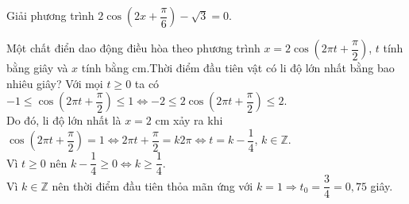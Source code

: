 
\TL

\begin{ex}%
	Giải phương trình $2 \cos \left(2 x+\dfrac{\pi}{6}\right)-\sqrt{3}=0$.
\end{ex}

\begin{ex}%
	Một chất điển dao động điều hòa theo phương trình $x= 2 \cos \left( 2\pi t + \dfrac{\pi}{2} \right)$, $t$ tính bằng giây và $x$ tính bằng cm.Thời điểm đầu tiên vật có li độ lớn nhất bằng bao nhiêu giây?
	\loigiai
	{
		Với mọi $t \ge 0$ ta có $-1 \le \cos \left( 2\pi t + \dfrac{\pi}{2} \right) \le 1 \Leftrightarrow -2 \le 2 \cos \left( 2\pi t + \dfrac{\pi}{2} \right) \le 2$.\\
		Do đó, li độ lớn nhất là $x=2$ cm xảy ra khi \\
		$ \cos \left( 2\pi t + \dfrac{\pi}{2} \right) =1 \Leftrightarrow 2\pi t + \dfrac{\pi}{2} = k2\pi \Leftrightarrow t = k - \dfrac{1}{4}$, $k \in \mathbb{Z}$.\\
		Vì $t \ge 0$ nên $k- \dfrac{1}{4} \ge 0 \Leftrightarrow k \ge \dfrac{1}{4}$.\\
		Vì $k \in \mathbb{Z}$ nên thời điểm đầu tiên thỏa mãn ứng với $k=1 \Rightarrow t_0 = \dfrac{3}{4} = 0{,}75$ giây.
	}
\end{ex}

